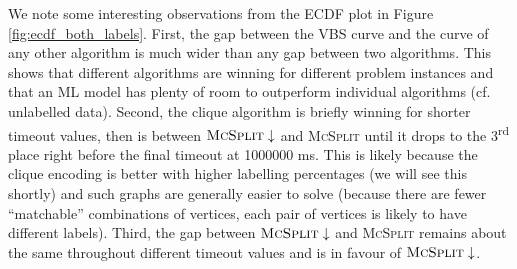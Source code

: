 \documentclass{l4proj}
\theoremstyle{definition}
\theoremstyle{remark}
\begin{document}
We note some interesting observations from the ECDF plot in Figure
\ref{fig:ecdf_both_labels}. First, the gap between the VBS curve and the curve
of any other algorithm is much wider than any gap between two algorithms. This
shows that different algorithms are winning for different problem instances and
that an ML model has plenty of room to outperform individual algorithms (cf.
unlabelled data). Second, the clique algorithm is briefly winning for shorter
timeout values, then is between $\textsc{McSplit}\downarrow$ and
\textsc{McSplit} until it drops to the 3\textsuperscript{rd} place right before
the final timeout at \num{1000000} ms. This is likely because the clique
encoding is better with higher labelling percentages (we will see this shortly)
and such graphs are generally easier to solve (because there are fewer
``matchable'' combinations of vertices, each pair of vertices is likely to have
different labels). Third, the gap between $\textsc{McSplit}\downarrow$ and
\textsc{McSplit} remains about the same throughout different timeout values and
is in favour of $\textsc{McSplit}\downarrow$.
\end{document}
